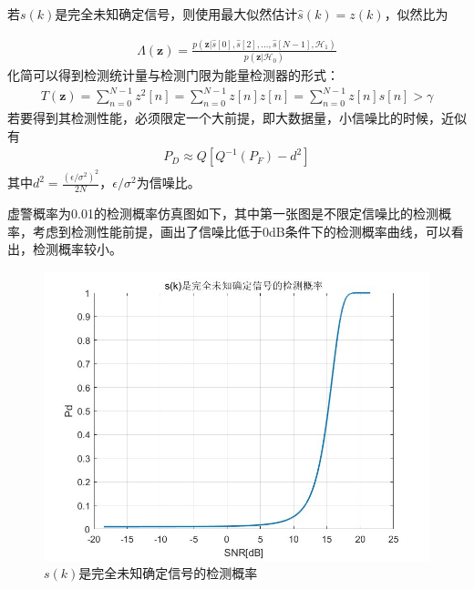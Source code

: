\documentclass[fontset=windows]{article}
\numberwithin{figure}{section}
\begin{document}
若\(s(k)\)是完全未知确定信号，则使用最大似然估计\(\hat{s}(k)=z(k)\)，似然比为

\begin{align*}
    \Lambda(\mathbf{z})=\frac{p(\mathbf{z}|\hat{s}[0],\hat{s}[2],\ldots,\hat{s}[N-1],\mathcal{H}_1)}{p(\mathbf{z}|\mathcal{H}_0)}
\end{align*}
化简可以得到检测统计量与检测门限为能量检测器的形式：
\begin{align*}
    T(\mathbf{z})=\sum_{n=0}^{N-1}z^2[n]=\sum_{n=0}^{N-1}z[n]z[n]=\sum_{n=0}^{N-1}z[n]\hat{s}[n]>\gamma
\end{align*}
若要得到其检测性能，必须限定一个大前提，即大数据量，小信噪比的时候，近似有
\begin{align*}
    P_D\approx Q[Q^{-1}(P_F)-d^2]
\end{align*}
其中\(d^2=\frac{(\epsilon/\sigma^2)^2}{2N}\)，\(\epsilon/\sigma^2\)为信噪比。

虚警概率为0.01的检测概率仿真图如下，其中第一张图是不限定信噪比的检测概率，考虑到检测性能前提，画出了信噪比低于0dB条件下的检测概率曲线，可以看出，检测概率较小。
\begin{figure}[H]
    \centering
    \includegraphics[scale=0.5]{fig4.1.jpg}
    \caption{\(s(k)\)是完全未知确定信号的检测概率}
    \label{4.1}
\end{figure}
\end{document}

